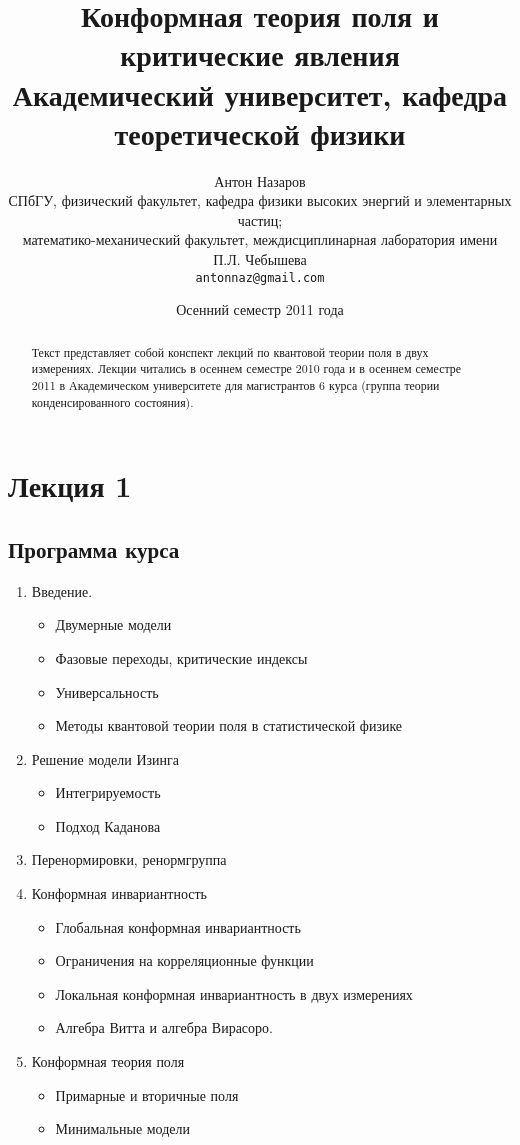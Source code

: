\documentclass[a4paper,12pt]{article}
\title{Конформная теория поля и критические явления\\
\small{Академический университет, кафедра теоретической физики}
}
\author{Антон Назаров\\
  \small{СПбГУ, физический факультет, кафедра физики высоких энергий и элементарных частиц;}\\
  \small{математико-механический факультет, междисциплинарная лаборатория имени П.Л. Чебышева}\\
  \texttt{antonnaz@gmail.com}
}
\date{Осенний семестр 2011 года}
\theoremstyle{definition}
\theoremstyle{definition}
\theoremstyle{definition}
\begin{document}
\maketitle
\thispagestyle{empty}
\begin{abstract}
  Текст представляет собой конспект лекций по квантовой теории поля в двух измерениях. Лекции читались в осеннем семестре 2010 года и в осеннем семестре 2011 в Академическом университете для магистрантов 6 курса (группа теории конденсированного состояния). 
\end{abstract}
\tableofcontents

\section{Лекция 1}
\label{sec:lecture-1}

\subsection{Программа курса}
\label{sec:program}
\begin{enumerate}
\item Введение.
  \begin{itemize}
  \item Двумерные модели
  \item Фазовые переходы, критические индексы
  \item Универсальность
  \item Методы квантовой теории поля в статистической физике
  \end{itemize}
\item Решение модели Изинга
  \begin{itemize}
  \item Интегрируемость
  \item Подход Каданова
  \end{itemize}
\item Перенормировки, ренормгруппа
\item Конформная инвариантность
  \begin{itemize}
  \item Глобальная конформная инвариантность
  \item Ограничения на корреляционные функции
  \item Локальная конформная инвариантность в двух измерениях
  \item Алгебра Витта и алгебра Вирасоро.
  \end{itemize}
\item Конформная теория поля
  \begin{itemize}
  \item Примарные и вторичные поля
  \item Минимальные модели
  \end{itemize}
\end{enumerate}
\end{document}
